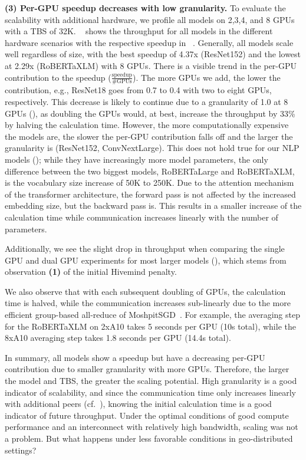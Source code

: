 \textbf{(3) Per-GPU speedup decreases with low granularity.}
To evaluate the scalability with additional hardware, we profile all models on 2,3,4, and 8 GPUs with a TBS of 32K.
~ shows the throughput for all models in the different hardware scenarios with the respective speedup in ~.
Generally, all models scale well regardless of size, with the best speedup of 4.37x (ResNet152) and the lowest at 2.29x (RoBERTaXLM) with 8 GPUs.
There is a visible trend in the per-GPU contribution to the speedup ($\frac{\text{speedup}}{\#\text{GPUs}}$).
The more GPUs we add, the lower the contribution, e.g., ResNet18 goes from 0.7 to 0.4 with two to eight GPUs, respectively.
This decrease is likely to continue due to a granularity of 1.0 at 8 GPUs (), as doubling the GPUs would, at best, increase the throughput by 33\% by halving the calculation time.
However, the more computationally expensive the models are, the slower the per-GPU contribution falls off and the larger the granularity is (ResNet152, ConvNextLarge).
This does not hold true for our NLP models (); while they have increasingly more model parameters, the only difference between the two biggest models, RoBERTaLarge and RoBERTaXLM, is the vocabulary size increase of 50K to 250K.
Due to the attention mechanism of the transformer architecture, the forward pass is not affected by the increased embedding size, but the backward pass is.
This results in a smaller increase of the calculation time while communication increases linearly with the number of parameters.

Additionally, we see the slight drop in throughput when comparing the single GPU and dual GPU experiments for most larger models (), which stems from observation \textbf{(1)} of the initial Hivemind penalty.  

We also observe that with each subsequent doubling of GPUs, the calculation time is halved, while the communication increases sub-linearly due to the more efficient group-based all-reduce of MoshpitSGD~\cite{ryabinin2021moshpit}.
For example, the averaging step for the RoBERTaXLM on 2xA10 takes 5 seconds per GPU (10s total), while the 8xA10 averaging step takes 1.8 seconds per GPU (14.4s total).

In summary, all models show a speedup but have a decreasing per-GPU contribution due to smaller granularity with more GPUs.
Therefore, the larger the model and TBS, the greater the scaling potential.
High granularity is a good indicator of scalability, and since the communication time only increases linearly with additional peers (cf.~), knowing the initial calculation time is a good indicator of future throughput.
Under the optimal conditions of good compute performance and an interconnect with relatively high bandwidth, scaling was not a problem.
But what happens under less favorable conditions in geo-distributed settings?